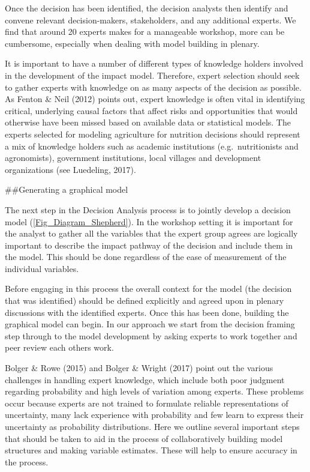 \documentclass[
]{article}
\begin{document}
Once the decision has been identified, the decision analysts then
identify and convene relevant decision-makers, stakeholders, and any
additional experts. We find that around 20 experts makes for a
manageable workshop, more can be cumbersome, especially when dealing
with model building in plenary.

It is important to have a number of different types of knowledge holders
involved in the development of the impact model. Therefore, expert
selection should seek to gather experts with knowledge on as many
aspects of the decision as possible. As Fenton \& Neil (2012) points
out, expert knowledge is often vital in identifying critical, underlying
causal factors that affect risks and opportunities that would otherwise
have been missed based on available data or statistical models. The
experts selected for modeling agriculture for nutrition decisions should
represent a mix of knowledge holders such as academic institutions
(e.g.~nutritionists and agronomists), government institutions, local
villages and development organizations (see Luedeling, 2017).

\#\#Generating a graphical model

The next step in the Decision Analysis process is to jointly develop a
decision model (\autoref{Fig_Diagram_Shepherd}). In the workshop setting
it is important for the analyst to gather all the variables that the
expert group agrees are logically important to describe the impact
pathway of the decision and include them in the model. This should be
done regardless of the ease of measurement of the individual variables.

Before engaging in this process the overall context for the model (the
decision that was identified) should be defined explicitly and agreed
upon in plenary discussions with the identified experts. Once this has
been done, building the graphical model can begin. In our approach we
start from the decision framing step through to the model development by
asking experts to work together and peer review each others work.

Bolger \& Rowe (2015) and Bolger \& Wright (2017) point out the various
challenges in handling expert knowledge, which include both poor
judgment regarding probability and high levels of variation among
experts. These problems occur because experts are not trained to
formulate reliable representations of uncertainty, many lack experience
with probability and few learn to express their uncertainty as
probability distributions. Here we outline several important steps that
should be taken to aid in the process of collaboratively building model
structures and making variable estimates. These will help to ensure
accuracy in the process.
\end{document}
